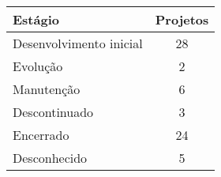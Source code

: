 \begin{tabular}{l c}
  \hline
  {\bf Estágio} & {\bf Projetos} \\
  \hline
    Desenvolvimento inicial & 28 \\
    Evolução & 2 \\
    Manutenção & 6 \\
    Descontinuado & 3 \\
    Encerrado & 24 \\
    Desconhecido & 5 \\
  \hline
\end{tabular}

